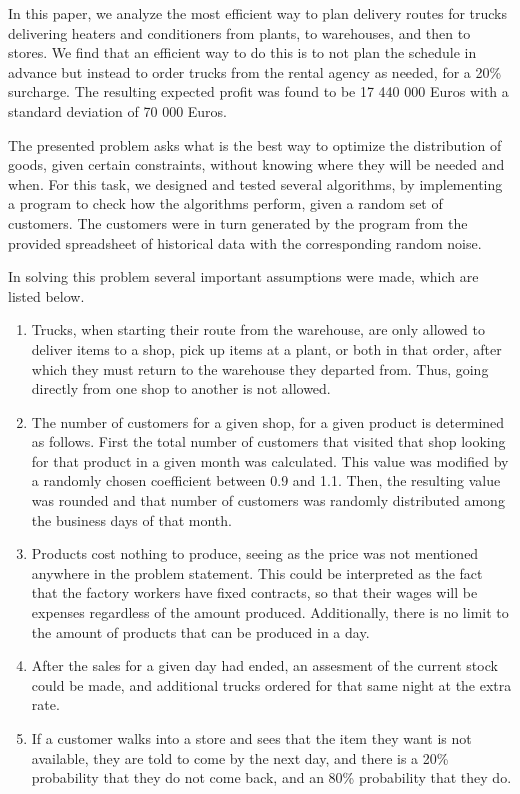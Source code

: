 
\physics

\begin{paperabs}
In this paper, we analyze the most efficient way to plan delivery routes for trucks delivering heaters and conditioners from plants, to warehouses, and then to stores.
We find that an efficient way to do this is to not plan the schedule in advance but instead to order trucks from the rental agency as needed, for a 20\% surcharge.
The resulting expected profit was found to be 17 440 000 Euros with a standard deviation of 70 000 Euros.
\end{paperabs}
\begin{paper}

The presented problem asks what is the best way to optimize the distribution of
goods, given certain constraints, without knowing where they will be needed and
when.
For this task, we designed and tested several algorithms, by implementing a
program to check how the algorithms perform, given a random set of customers.
The customers were in turn generated by the program from the provided
spreadsheet of historical data with the corresponding random noise.

In solving this problem several important assumptions were made, which are
listed below.
\begin{enumerate}
\item
Trucks, when starting their route from the warehouse, are only allowed to
deliver items to a shop, pick up items at a plant, or both in that order, after
which they must return to the warehouse they departed from.
Thus, going directly from one shop to another is not allowed.
\item
The number of customers for a given shop, for a given product is determined
as follows.
First the total number of customers that visited that shop looking for that
product in a given month was calculated.
This value was modified by a randomly chosen coefficient between 0.9 and 1.1.
Then, the resulting value was rounded and that number of customers was randomly
distributed among the business days of that month.
\item
Products cost nothing to produce, seeing as the price was
not mentioned anywhere in the problem statement.
This could be interpreted as the fact that the factory workers have fixed
contracts, so that their wages will be expenses regardless of the amount
produced.
Additionally, there is no limit to the amount of products that can be produced
in a day.
\item
After the sales for a given day had ended, an assesment of the current stock
could be made, and additional trucks ordered for that same night at the extra
rate.
\item
If a customer walks into a store and sees that the item they want is not
available, they are told to come by the next day, and there is a 20\%
probability that they do not come back, and an 80\% probability that they do.
\end{enumerate}


\end{paper}
